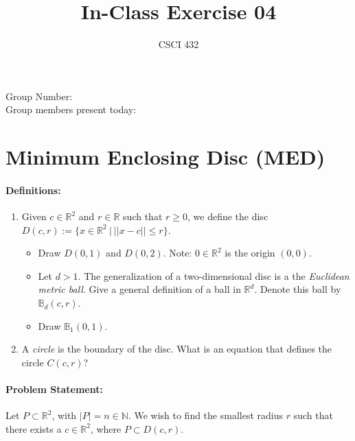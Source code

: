 \documentclass{article}
\title{In-Class Exercise 04}
\author{CSCI 432}
\def\R{{\mathbb R}}
\def\N{{\mathbb N}}
\begin{document}
\maketitle

\noindent
Group Number:\\
Group members present today:

\section*{Minimum Enclosing Disc (MED)}

\paragraph{Definitions:}

\begin{enumerate}
\item Given $c \in \R^2$ and $r \in \R$ such that $r \geq 0$, we define the
disc $D(c,r) := \{ x \in \R^2 ~|~ ||x-c|| \leq r \}$.
\begin{itemize}
\item Draw $D(0,1)$ and $D(0,2)$. Note: $0\in \R^2$ is the origin
$(0,0)$.
\vspace{3ex}
\item Let $d>1$.  The generalization of a two-dimensional disc is a
the \emph{Euclidean metric ball}.  Give a general definition of
a ball in $\R^d$.  Denote this ball by $\mathbb{B}_d(c,r)$.
\vspace{3ex}
\item Draw $\mathbb{B}_1(0,1)$.
\vspace{3ex}
\end{itemize}
\item A \emph{circle} is the boundary of the disc.  What is an equation that
defines the circle $C(c,r)$?
\vspace{3ex}
\end{enumerate}

\paragraph{Problem Statement:}

Let $P \subset \R^2$, with $|P|=n \in \N$.  We wish to find the smallest radius
$r$ such that there exists a $c \in \R^2$, where $P \subset D(c,r)$.
\end{document}
